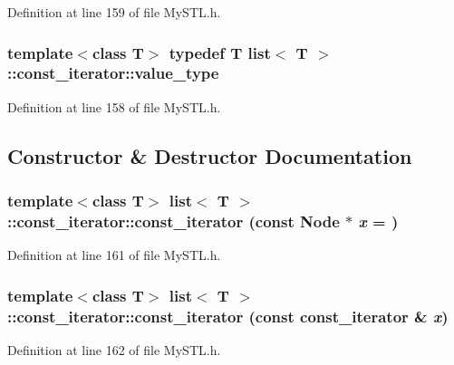 Definition at line 159 of file MySTL.h.

\subsubsection[{value\_\-type}]{\setlength{\rightskip}{0pt plus 5cm}template$<$class T$>$ typedef T {\bf list}$<$ T $>$::{\bf const\_\-iterator::value\_\-type}}\label{classlist_1_1const__iterator_a5588973ab78dd8bc590764095982d56e}


Definition at line 158 of file MySTL.h.



\subsection{Constructor \& Destructor Documentation}
\subsubsection[{const\_\-iterator}]{\setlength{\rightskip}{0pt plus 5cm}template$<$class T$>$ {\bf list}$<$ T $>$::const\_\-iterator::const\_\-iterator (const Node $\ast$ {\em x} = {})}\label{classlist_1_1const__iterator_a2e4721f74e34760b176f69e2ae329d01}


Definition at line 161 of file MySTL.h.

\subsubsection[{const\_\-iterator}]{\setlength{\rightskip}{0pt plus 5cm}template$<$class T$>$ {\bf list}$<$ T $>$::const\_\-iterator::const\_\-iterator (const {\bf const\_\-iterator} \& {\em x})}\label{classlist_1_1const__iterator_af5e29ae94aa5fd5d8f31cb64095de5b5}


Definition at line 162 of file MySTL.h.

